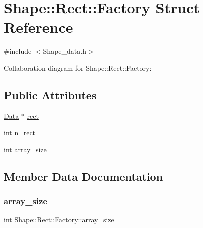 \hypertarget{struct_shape_1_1_rect_1_1_factory}{}\section{Shape\+:\+:Rect\+:\+:Factory Struct Reference}
\label{struct_shape_1_1_rect_1_1_factory}


{\ttfamily \#include $<$Shape\+\_\+data.\+h$>$}



Collaboration diagram for Shape\+:\+:Rect\+:\+:Factory\+:
\subsection*{Public Attributes}
\begin{DoxyCompactItemize}
\item 
\mbox{\hyperlink{struct_shape_1_1_rect_1_1_data}{Data}} $\ast$ \mbox{\hyperlink{struct_shape_1_1_rect_1_1_factory_a72395ba123b6649287ba2f84c7bcc9b5}{rect}}
\item 
int \mbox{\hyperlink{struct_shape_1_1_rect_1_1_factory_a14969d152c29ba7759440568d024bd69}{n\+\_\+rect}}
\item 
int \mbox{\hyperlink{struct_shape_1_1_rect_1_1_factory_a476fb053f87d9d91850fa2c84c2265df}{array\+\_\+size}}
\end{DoxyCompactItemize}


\subsection{Member Data Documentation}
\mbox{\label{struct_shape_1_1_rect_1_1_factory_a476fb053f87d9d91850fa2c84c2265df}} 
\subsubsection{\texorpdfstring{array\+\_\+size}{array\_size}}
{\footnotesize\ttfamily int Shape\+::\+Rect\+::\+Factory\+::array\+\_\+size}

\mbox{\label{struct_shape_1_1_rect_1_1_factory_a14969d152c29ba7759440568d024bd69}} 
